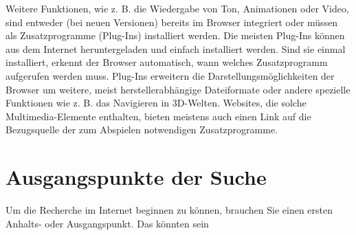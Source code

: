 \documentclass[]{book}
\theoremstyle{definition}
\theoremstyle{definition}
\theoremstyle{definition}
\theoremstyle{remark}
\begin{document}
Weitere Funktionen, wie z. B. die Wiedergabe von Ton, Animationen oder
Video, sind entweder (bei neuen Versionen) bereits im Browser integriert
oder müssen als Zusatzprogramme (Plug-Ins) installiert werden. Die
meisten Plug-Ins können aus dem Internet heruntergeladen und einfach
installiert werden. Sind sie einmal installiert, erkennt der Browser
automatisch, wann welches Zusatzprogramm aufgerufen werden muss.
Plug-Ins erweitern die Darstellungsmöglichkeiten der Browser um weitere,
meist herstellerabhängige Dateiformate oder andere spezielle Funktionen
wie z. B. das Navigieren in 3D-Welten. Websites, die solche
Multimedia-Elemente enthalten, bieten meistens auch einen Link auf die
Bezugsquelle der zum Abspielen notwendigen Zusatzprogramme.

\section{Ausgangspunkte der Suche}\label{ausgangspunkte-der-suche}

Um die Recherche im Internet beginnen zu können, brauchen Sie einen
ersten Anhalts- oder Ausgangspunkt. Das könnten sein
\end{document}
